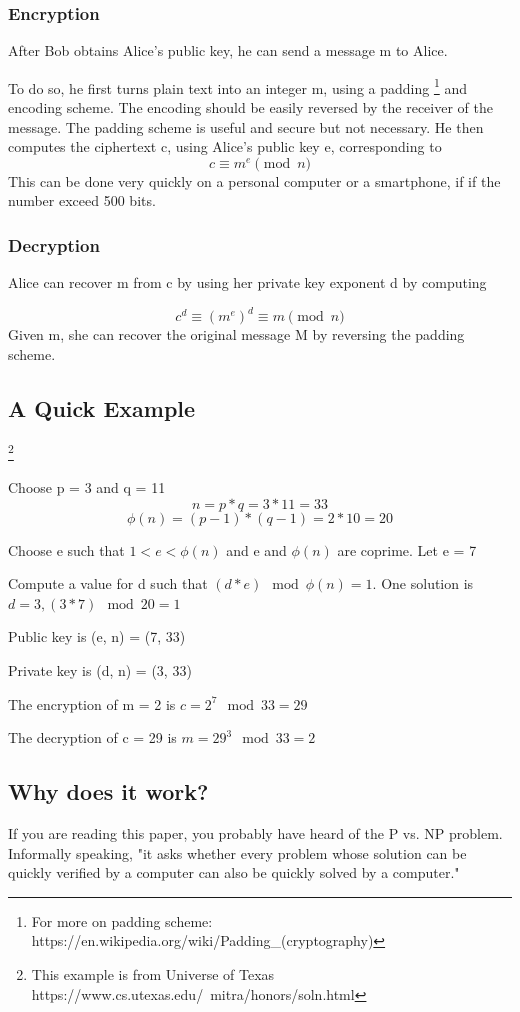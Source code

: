 \documentclass[]{article}
\begin{document}
\subsubsection{Encryption}
After Bob obtains Alice's public key, he can send a message m to Alice.

To do so, he first turns plain text into an integer m, using a padding \footnote{For more on padding scheme: https://en.wikipedia.org/wiki/Padding\_(cryptography)} and encoding scheme.  The encoding should be easily reversed by the receiver of the message. The padding scheme is useful and secure but not necessary. He then computes the ciphertext c, using Alice's public key e, corresponding to
\[c \equiv m^e \pmod{n} \]
This can be done very quickly on a personal computer or a smartphone, if if the number exceed 500 bits.

\subsubsection{Decryption}
Alice can recover m from c by using her private key exponent d by computing

\[{c^{d}\equiv (m^{e})^{d}\equiv m{\pmod {n}}}\]
Given m, she can recover the original message M by reversing the padding scheme.

\subsection{A Quick Example}\footnote{This example is from Universe of Texas https://www.cs.utexas.edu/~mitra/honors/soln.html}

Choose p = 3 and q = 11 
\[n = p * q = 3 * 11 = 33\]
\[\phi(n) = (p - 1) * (q - 1) = 2 * 10 = 20\]

Choose e such that \(1 < e < \phi(n)\) and e and \(\phi (n)\) are coprime. Let e = 7

Compute a value for d such that \((d * e)\mod  \phi(n) = 1\). One solution is \(d = 3, (3 * 7) \mod 20 = 1\)

Public key is (e, n) = (7, 33)

Private key is (d, n) = (3, 33)

The encryption of m = 2 is \(c = 2^{7} \mod 33 = 29\)

The decryption of c = 29 is \(m = 29^{3} \mod 33 = 2\)

\subsection{Why does it work?}
If you are reading this paper, you probably have heard of the P vs. NP problem. Informally speaking, "it asks whether every problem whose solution can be quickly verified by a computer can also be quickly solved by a computer." 
\end{document}

